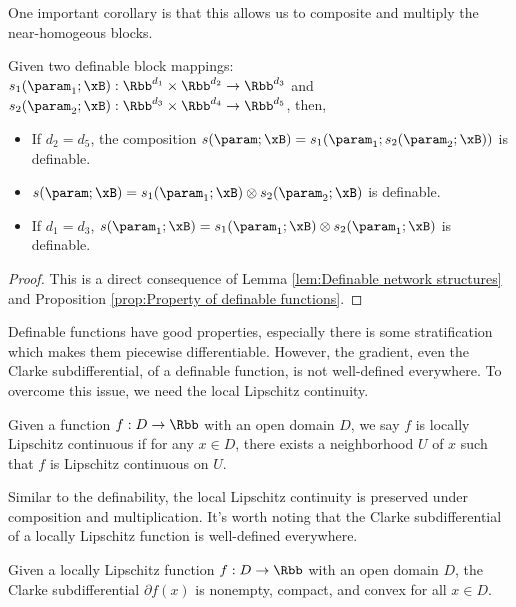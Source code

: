 One important corollary is that this allows us to composite and multiply the near-homogeous blocks.  


\begin{corollary}
\label{cor:Composition and multiplication of definable blocks}
Given two definable block mappings: $s_1(\param_1; \xB): \Rbb^{d_1} \times \Rbb^{d_2} \to \Rbb^{d_3}$ and $s_2(\param_2; \xB): \Rbb^{d_3} \times \Rbb^{d_4} \to \Rbb^{d_5}$, then, 
\begin{itemize}
    \item If $d_2= d_5$, the composition $s(\param; \xB) = s_1(\param_1; s_2(\param_2;\xB)) $ is definable.
    \item $s(\param; \xB) = s_1(\param_1; \xB) \otimes s_2(\param_2; \xB)$ is definable.
    \item If $d_1 = d_3$, $s(\param_1; \xB) = s_1(\param_1; \xB) \otimes s_2(\param_1; \xB)$ is definable.
\end{itemize}
\end{corollary}
\begin{proof}
    This is a direct consequence of Lemma \ref{lem:Definable network structures} and Proposition \ref{prop:Property of definable functions}.
\end{proof}

Definable functions have good properties, especially there is some stratification which makes them piecewise differentiable. However, the gradient, even the Clarke subdifferential, of a definable function, is not well-defined everywhere. To overcome this issue, we need the local Lipschitz continuity.  


\begin{definition}
\label{def:Local Lipschitz continuity}
Given a function $f: D \to \Rbb$ with an open domain $D$, we say $f$ is locally Lipschitz continuous if for any $x \in D$, there exists a neighborhood $U$ of $x$ such that $f$ is Lipschitz continuous on $U$.
\end{definition}

Similar to the definability, the local Lipschitz continuity is preserved under composition and multiplication.
It's worth noting that the Clarke subdifferential of a locally Lipschitz function is well-defined everywhere.


\begin{lemma}
\label{lem:Clarke subdifferential of locally Lipschitz functions}
Given a locally Lipschitz function $f: D \to \Rbb$ with an open domain $D$, the Clarke subdifferential $\partial f(x)$ is nonempty, compact, and convex for all $x \in D$.
\end{lemma}


